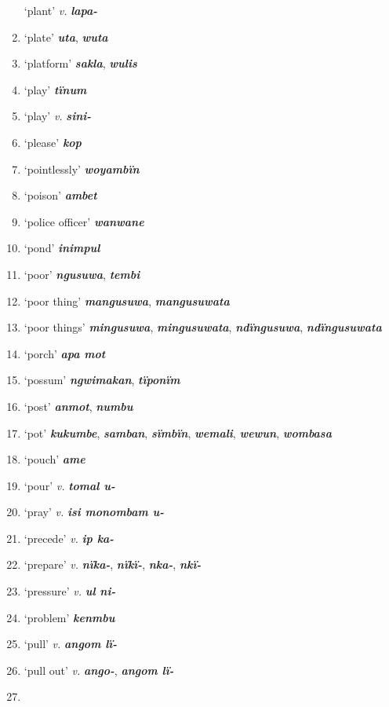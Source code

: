 \begin{enumerate}[noitemsep, label={}, align=left, widest=190, labelsep=1ex,leftmargin=*,itemindent=-10pt]
‘plant’ \textit{v.} \textbf{\textit{lapa-}} \item
‘plate’ \textbf{\textit{uta}}, \textbf{\textit{wuta}} \item
‘platform’ \textbf{\textit{sakla}}, \textbf{\textit{wulis}} \item
‘play’ \textbf{\textit{tïnum}} \item
‘play’ \textit{v.} \textbf{\textit{sini-}} \item
‘please’ \textbf{\textit{kop}} \item
‘pointlessly’ \textbf{\textit{woyambïn}} \item
‘poison’ \textbf{\textit{ambet}} \item
‘police officer’ \textbf{\textit{wanwane}} \item
‘pond’ \textbf{\textit{inimpul}} \item
‘poor’ \textbf{\textit{ngusuwa}}, \textbf{\textit{tembi}} \item
‘poor thing’ \textbf{\textit{mangusuwa}}, \textbf{\textit{mangusuwata}} \item
‘poor things’ \textbf{\textit{mingusuwa}}, \textbf{\textit{mingusuwata}}, \textbf{\textit{ndïngusuwa}}, \textbf{\textit{ndïngusuwata}} \item
‘porch’ \textbf{\textit{apa mot}} \item
‘possum’ \textbf{\textit{ngwimakan}}, \textbf{\textit{tïponïm}} \item
‘post’ \textbf{\textit{anmot}}, \textbf{\textit{numbu}} \item
‘pot’ \textbf{\textit{kukumbe}}, \textbf{\textit{samban}}, \textbf{\textit{sïmbïn}}, \textbf{\textit{wemali}}, \textbf{\textit{wewun}}, \textbf{\textit{wombasa}} \item
‘pouch’ \textbf{\textit{ame}} \item
‘pour’ \textit{v.} \textbf{\textit{tomal u-}} \item
‘pray’ \textit{v.} \textbf{\textit{isi monombam u-}} \item
‘precede’ \textit{v.} \textbf{\textit{ip ka-}} \item
‘prepare’ \textit{v.} \textbf{\textit{nïka-}}, \textbf{\textit{nïkï-}}, \textbf{\textit{nka-}}, \textbf{\textit{nkï-}} \item
‘pressure’ \textit{v.} \textbf{\textit{ul ni-}} \item
‘problem’ \textbf{\textit{kenmbu}} \item
‘pull’ \textit{v.} \textbf{\textit{angom lï-}} \item
‘pull out’ \textit{v.} \textbf{\textit{ango-}}, \textbf{\textit{angom lï-}} \item

\end{enumerate}
